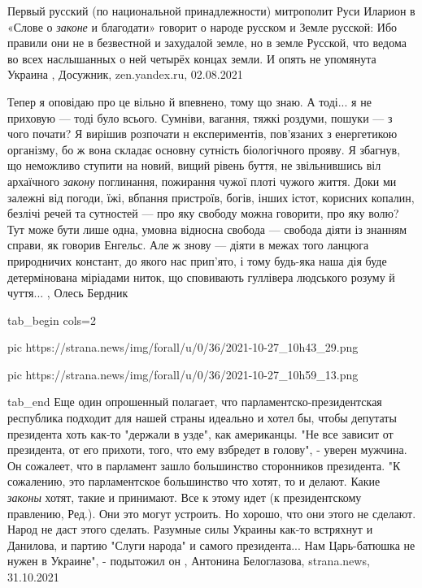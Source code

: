 Первый русский (по национальной принадлежности) митрополит Руси Иларион в
«Слове о \emph{законе} и благодати» говорит о народе русском и Земле русской:
Ибо правили они не в безвестной и захудалой земле, но в земле Русской, что
ведома во всех наслышанных о ней четырёх концах земли.
И опять не упомянута Украина
, Досужник, zen.yandex.ru, 02.08.2021

Тепер я оповідаю про це вільно й впевнено, тому що знаю. А тоді... я не приховую
— тоді було всього. Сумніви, вагання, тяжкі роздуми, пошуки — з чого почати? Я
вирішив розпочати н експериментів, пов’язаних з енергетикою організму, бо ж
вона складає основну сутність біологічного прояву. Я збагнув, що неможливо
ступити на новий, вищий рівень буття, не звільнившись віл архаїчного \emph{закону}
поглинання, пожирання чужої плоті чужого життя. Доки ми залежні від погоди,
їжі, вбпання пристроїв, богів, інших істот, корисних копалин, безлічі речей та
сутностей — про яку свободу можна говорити, про яку волю? Тут може бути лише
одна, умовна відносна свобода — свобода діяти із знанням справи, як говорив
Енгельс. Але ж знову — діяти в межах того ланцюга природничих констант, до
якого нас прип'ято, і тому будь-яка наша дія буде детермінована міріадами
ниток, що сповивають гуллівера людського розуму й чуття...
, Олесь Бердник


\ifcmt
  tab_begin cols=2

     pic https://strana.news/img/forall/u/0/36/2021-10-27_10h43_29.png

     pic https://strana.news/img/forall/u/0/36/2021-10-27_10h59_13.png

  tab_end
\fi
Еще один опрошенный полагает, что парламентско-президентская республика
подходит для нашей страны идеально и хотел бы, чтобы депутаты президента хоть
как-то "держали в узде", как американцы. "Не все зависит от президента, от его
прихоти, того, что ему взбредет в голову", - уверен мужчина.  Он сожалеет, что
в парламент зашло большинство сторонников президента.  "К сожалению, это
парламентское большинство что хотят, то и делают. Какие \emph{законы} хотят, такие и
принимают. Все к этому идет (к президентскому правлению, Ред.). Они это могут
устроить. Но хорошо, что они этого не сделают. Народ не даст этого сделать.
Разумные силы Украины как-то встряхнут и Данилова, и партию "Слуги народа" и
самого президента... Нам Царь-батюшка не нужен в Украине", - подытожил он
, 
Антонина Белоглазова, strana.news, 31.10.2021
